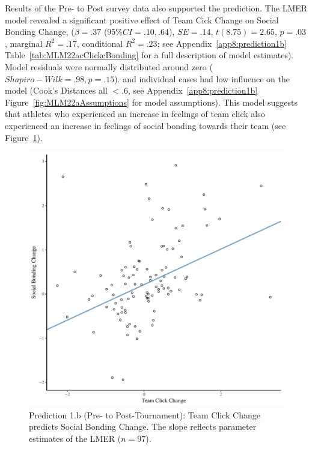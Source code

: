 \begin{CJK}{UTF8}{gbsn}
Results of the Pre- to Post survey data also supported the prediction.
The LMER model revealed a significant positive effect of Team Cick Change on Social Bonding Change, ($\beta = .37$ ($95\% CI =  .10, .64$), $SE = .14$, $t(8.75) = 2.65$, $p = .03$, marginal $R^2 = .17$, conditional $R^2 = .23$; see Appendix~\ref{app8:prediction1b} Table~\ref{tab:MLM22acClickcBonding} for a full description of model estimates).  Model residuals were normally distributed around zero ($Shapiro-Wilk = .98, p = .15$). and individual cases had low influence on the model (Cook's Distances all $< .6$, see Appendix~\ref{app8:prediction1b} Figure~\ref{fig:MLM22aAssumptions} for model assumptions).  This model suggests that athletes who experienced an increase in feelings of team click also experienced an increase in feelings of social bonding towards their team (see Figure~\ref{fig:clickBondDeltaModelSlope}).


  \begin{figure}[htbp]
    \centering
  \includegraphics[scale=.5]{images/clickBondDeltaModelSlope.pdf}
    \caption{Prediction 1.b (Pre- to Post-Tournament): Team Click Change predicts Social Bonding Change. The slope reflects parameter estimates of the LMER ($n = 97$).}
    \label{fig:clickBondDeltaModelSlope}
  \end{figure}



\end{CJK}
